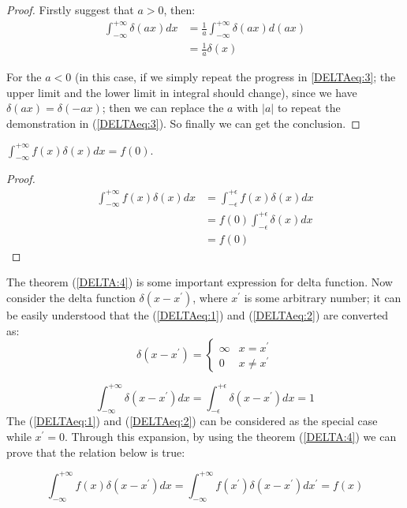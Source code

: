 \begin{proof}
Firstly suggest that $a>0$, then:
\begin{equation}\label{DELTAeq:3}
\begin{split}
  \int_{-\infty}^{+\infty}\delta(ax)dx &=
  \frac{1}{a}\int_{-\infty}^{+\infty}\delta(ax)d(ax) \\
    &= \frac{1}{a}\delta(x)
\end{split}
\end{equation}

For the $a < 0$ (in this case, if we simply repeat the progress in
\ref{DELTAeq:3}; the upper limit and the lower limit in integral
should change), since we have $\delta(ax) = \delta(-ax)$; then we
can replace the $a$ with $|a|$ to repeat the demonstration in
(\ref{DELTAeq:3}). So finally we can get the conclusion. \qedhere
\end{proof}

\begin{theorem}
\label{DELTA:4}
$\int_{-\infty}^{+\infty}f(x)\delta(x)dx = f(0)$.
\end{theorem}

\begin{proof}
\begin{equation}\label{}
\begin{split}
  \int_{-\infty}^{+\infty}f(x)\delta(x)dx &=
  \int_{-\epsilon}^{+\epsilon}f(x)\delta(x)dx \\
    &= f(0)\int_{-\epsilon}^{+\epsilon}\delta(x)dx \\
    &= f(0)
\end{split}
\end{equation} \qedhere
\end{proof}

The theorem (\ref{DELTA:4}) is some important expression for delta
function. Now consider the delta function $\delta (x - x^{'})$,
where $x^{'}$ is some arbitrary number; it can be easily understood
that the (\ref{DELTAeq:1}) and (\ref{DELTAeq:2}) are converted as:
\begin{equation}
\label{DELTAeq:5} \delta (x - x^{'}) = \begin{cases}
    \infty & x = x^{'} \\
    0 & x \neq x^{'}
  \end{cases}
\end{equation}

\begin{equation}
\label{DELTAeq:6}
 \int_{-\infty}^{+\infty}\delta (x - x^{'})dx =
\int_{-\epsilon}^{+\epsilon}\delta (x - x^{'})dx = 1
\end{equation}
The (\ref{DELTAeq:1}) and (\ref{DELTAeq:2}) can be considered as the
special case while $x^{'} = 0$. Through this expansion, by using the
theorem (\ref{DELTA:4}) we can prove that the relation below is
true:
\begin{theorem}
\begin{equation}\label{DELTAeq:7}
\int_{-\infty}^{+\infty}f(x)\delta(x - x^{'})dx =
\int_{-\infty}^{+\infty}f(x^{'})\delta(x - x^{'})dx^{'} =f(x)
\end{equation}
\end{theorem}

